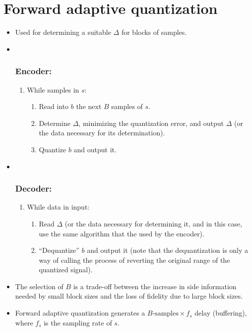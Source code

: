 \section{Forward adaptive quantization}
\begin{itemize}
\item
  Used for determining a suitable \(\Delta\) for blocks of samples.
\item ~
  \hypertarget{encoder}{%
  \subsubsection*{Encoder:}\label{encoder}}

  \begin{enumerate}
  \def\labelenumi{\arabic{enumi}.}
  \tightlist
  \item
    While samples in \(s\):

    \begin{enumerate}
    \def\labelenumii{\arabic{enumii}.}
    \tightlist
    \item
      Read into \(b\) the next \(B\) samples of \(s\).
    \item
      Determine \(\Delta\), minimizing the quantization error, and
      output \(\Delta\) (or the data necessary for its determination).
    \item
      Quantize \(b\) and output it.
    \end{enumerate}
  \end{enumerate}
\item ~
  \hypertarget{decoder}{%
  \subsubsection*{Decoder:}\label{decoder}}

  \begin{enumerate}
  \def\labelenumi{\arabic{enumi}.}
  \tightlist
  \item
    While data in input:

    \begin{enumerate}
    \def\labelenumii{\arabic{enumii}.}
    \tightlist
    \item
      Read \(\Delta\) (or the data necessary for determining it, and in
      this case, use the same algorithm that the used by the encoder).
    \item
      ``Dequantize'' \(b\) and output it (note that the dequantization
      is only a way of calling the process of reverting the original
      range of the quantized signal).
    \end{enumerate}
  \end{enumerate}
\item
  The selection of \(B\) is a trade-off between the increase in side
  information needed by small block sizes and the loss of fidelity due
  to large block sizes.
\item
  Forward adaptive quantization generates a
  \(B\text{-samples}\times f_s\) delay (buffering), where \(f_s\) is the
  sampling rate of \(s\).
\end{itemize}

